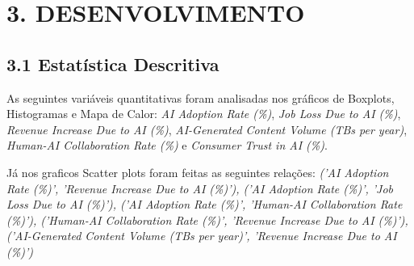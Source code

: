 \documentclass[12pt]{article}
\begin{document}
\section*{3. DESENVOLVIMENTO}

\subsection*{3.1 Estatística Descritiva}

As seguintes variáveis quantitativas foram analisadas nos gráficos de Boxplots, Histogramas e Mapa de Calor:
\textit{AI Adoption Rate (\%)}, \textit{Job Loss Due to AI (\%)}, \textit{Revenue Increase Due to AI (\%)}, \textit{AI-Generated Content Volume (TBs per year)}, \textit{Human-AI Collaboration Rate (\%)} e \textit{Consumer Trust in AI (\%)}.

Já nos graficos Scatter plots foram feitas as seguintes relações:\textit{
    ('AI Adoption Rate (\%)',
    'Revenue Increase Due to AI (\%)'),
    ('AI Adoption Rate (\%)',
    'Job Loss Due to AI (\%)'),
    ('AI Adoption Rate (\%)',
    'Human-AI Collaboration Rate (\%)'),
    ('Human-AI Collaboration Rate (\%)',
    'Revenue Increase Due to AI (\%)'),
    ('AI-Generated Content Volume (TBs per year)',
    'Revenue Increase Due to AI (\%)')
}
\newpage
\end{document}
